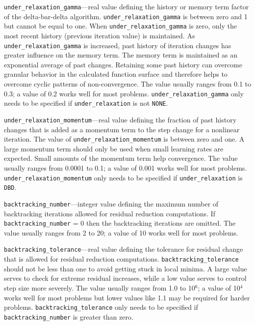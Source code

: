 \begin{description}
\item \texttt{under\_relaxation\_gamma}---real value defining the history or memory term factor of the delta-bar-delta algorithm. \texttt{under\_relaxation\_gamma} is between zero and 1 but cannot be equal to one. When \texttt{under\_relaxation\_gamma} is zero, only the most recent history (previous iteration value) is maintained. As \texttt{under\_relaxation\_gamma} is increased, past history of iteration changes has greater influence on the memory term. The memory term is maintained as an exponential average of past changes. Retaining some past history can overcome granular behavior in the calculated function surface and therefore helps to overcome cyclic patterns of non-convergence. The value usually ranges from 0.1 to 0.3; a value of 0.2 works well for most problems. \texttt{under\_relaxation\_gamma} only needs to be specified if \texttt{under\_relaxation} is not \texttt{NONE}.

\item \texttt{under\_relaxation\_momentum}---real value defining the fraction of past history changes that is added as a momentum term to the step change for a nonlinear iteration. The value of \texttt{under\_relaxation\_momentum} is between zero and one. A large momentum term should only be used when small learning rates are expected. Small amounts of the momentum term help convergence. The value usually ranges from 0.0001 to 0.1; a value of 0.001 works well for most problems. \texttt{under\_relaxation\_momentum} only needs to be specified if \texttt{under\_relaxation} is \texttt{DBD}.

\item \texttt{backtracking\_number}---integer value defining the maximum number of backtracking iterations allowed for residual reduction computations. If \texttt{backtracking\_number} = 0 then the backtracking iterations are omitted. The value usually ranges from 2 to 20; a value of 10 works well for most problems.

\item \texttt{backtracking\_tolerance}---real value defining the tolerance for residual change that is allowed for residual reduction computations. \texttt{backtracking\_tolerance} should not be less than one to avoid getting stuck in local minima. A large value serves to check for extreme residual increases, while a low value serves to control step size more severely. The value usually ranges from 1.0 to 10$^6$; a value of 10$^4$ works well for most problems but lower values like 1.1 may be required for harder problems. \texttt{backtracking\_tolerance} only needs to be specified if \texttt{backtracking\_number} is greater than zero.


\end{description}
